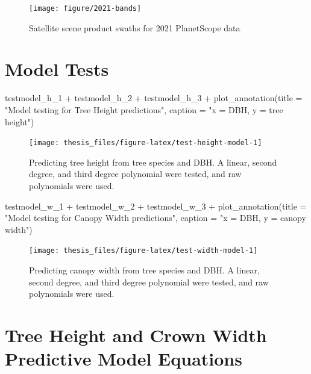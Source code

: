 \documentclass[12pt,twoside]{reedthesis}
\newenvironment{Shaded}{\begin{snugshade}}{\end{snugshade}}
\newcommand{\AttributeTok}[1]{\textcolor[rgb]{0.77,0.63,0.00}{#1}}
\newcommand{\FunctionTok}[1]{\textcolor[rgb]{0.00,0.00,0.00}{#1}}
\newcommand{\NormalTok}[1]{#1}
\newcommand{\SpecialCharTok}[1]{\textcolor[rgb]{0.00,0.00,0.00}{#1}}
\newcommand{\StringTok}[1]{\textcolor[rgb]{0.31,0.60,0.02}{#1}}
\begin{document}
\begin{figure}

{\centering \texttt{[image: figure/2021-bands]} 

}

\caption{Satellite scene product swaths for 2021 PlanetScope data}\label{fig:2021-swath}
\end{figure}
\hypertarget{model-tests}{%
\section*{Model Tests}\label{model-tests}}
\begin{Shaded}
\begin{Highlighting}[]
\NormalTok{testmodel\_h\_1 }\SpecialCharTok{+}\NormalTok{ testmodel\_h\_2 }\SpecialCharTok{+}\NormalTok{ testmodel\_h\_3 }\SpecialCharTok{+} \FunctionTok{plot\_annotation}\NormalTok{(}\AttributeTok{title =} \StringTok{"Model testing for Tree Height predictions"}\NormalTok{,}
    \AttributeTok{caption =} \StringTok{"x = DBH, y = tree height"}\NormalTok{)}
\end{Highlighting}
\end{Shaded}
\begin{figure}

{\centering \texttt{[image: thesis\_files/figure-latex/test-height-model-1]} 

}

\caption[Model tests for tree height predictions]{Predicting tree height from tree species and DBH. A linear, second degree, and third degree polynomial were tested, and raw polynomials were used.}\label{fig:test-height-model}
\end{figure}
\begin{Shaded}
\begin{Highlighting}[]
\NormalTok{testmodel\_w\_1 }\SpecialCharTok{+}\NormalTok{ testmodel\_w\_2 }\SpecialCharTok{+}\NormalTok{ testmodel\_w\_3 }\SpecialCharTok{+} \FunctionTok{plot\_annotation}\NormalTok{(}\AttributeTok{title =} \StringTok{"Model testing for Canopy Width predictions"}\NormalTok{,}
    \AttributeTok{caption =} \StringTok{"x = DBH, y = canopy width"}\NormalTok{)}
\end{Highlighting}
\end{Shaded}
\begin{figure}

{\centering \texttt{[image: thesis\_files/figure-latex/test-width-model-1]} 

}

\caption[Model tests for tree canopy width predictions]{Predicting canopy width from tree species and DBH. A linear, second degree, and third degree polynomial were tested, and raw polynomials were used.}\label{fig:test-width-model}
\end{figure}
\hypertarget{tree-height-and-crown-width-predictive-model-equations}{%
\section*{Tree Height and Crown Width Predictive Model Equations}\label{tree-height-and-crown-width-predictive-model-equations}}
\end{document}
